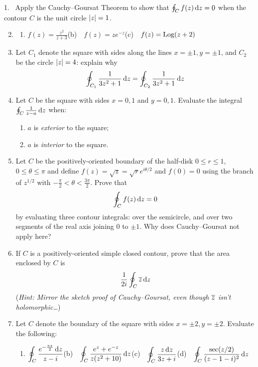 \begin{exercises*}
\hangindent\leftmargini
\textup{1.} \  Apply the Cauchy--Goursat Theorem to show that $\oint_Cf(z)\,{\mathrm{d} z}=0$ when the contour $C$ is the unit circle $\left| z\right|=1$.
\begin{enumerate}\setcounter{enumi}{1}
  \item[]\begin{enumerate}
    \item $\displaystyle f(z)=\frac{z^2}{z+3}$\qquad (b)\ \ $\displaystyle f(z)=ze^{-z}$\qquad (c)\ \ $\displaystyle f(z)=\operatorname{Log}(z+2)$
	\end{enumerate}
	
	\item Let $C_1$ denote the square with sides along the lines $x=\pm 1,y=\pm 1$, and $C_2$ be the circle $\left| z\right|=4$: explain why
	\[\oint_{C_1}\frac 1{3z^2+1}\,{\mathrm{d} z}=\oint_{C_2}\frac 1{3z^2+1}\,{\mathrm{d} z}\]
	
	\item Let $C$ be the square with sides $x=0,1$ and $y=0,1$. Evaluate the integral $\oint_C\frac 1{z-a}\,{\mathrm{d} z}$ when:
	\begin{enumerate}
	  \item $a$ is \emph{exterior} to the square;
	  \item $a$ is \emph{interior} to the square.
	\end{enumerate}
	
	\item Let $C$ be the positively-oriented boundary of the half-disk $0\le r\le 1$, $0\le\theta\le\pi$ and define $f(z)=\sqrt z=\sqrt re^{i\theta/2}$ and $f(0)=0$ using the branch of $z^{1/2}$ with $-\frac{\pi}2<\theta<\frac{3\pi}2$. Prove that
	\[\oint_Cf(z)\,{\mathrm{d} z}=0\]
	by evaluating three contour integrals: over the semicircle, and over two segments of the real axis joining 0 to $\pm 1$. Why does Cauchy--Goursat not apply here?
	
	\item If $C$ is a positively-oriented simple closed contour, prove that the area enclosed by $C$ is
	\[\frac 1{2i}\oint_C\overline{z}\,{\mathrm{d} z}\]
	(\emph{Hint: Mirror the sketch proof of Cauchy--Goursat, even though $\overline{z}$ isn't holomorphic\ldots})
	
  \item Let $C$ denote the boundary of the square with sides $x=\pm 2,y=\pm 2$. Evaluate the following:
  \begin{enumerate}
    \item $\displaystyle\oint_C\frac{e^{-\frac{\pi z}2}\,{\mathrm{d} z}}{z-i}$\qquad (b)\ \ $\displaystyle\oint_C\frac{e^z+e^{-z}}{z(z^2+10)}\,{\mathrm{d} z}$\qquad (c)\ \ $\displaystyle\oint_C\frac{z\,{\mathrm{d} z}}{3z+i}$\qquad (d)\ \ $\displaystyle\oint_C\frac{\sec(z/2)}{(z-1-i)^2}\,{\mathrm{d} z}$
  \end{enumerate}
  

\end{enumerate}
\end{exercises*}
